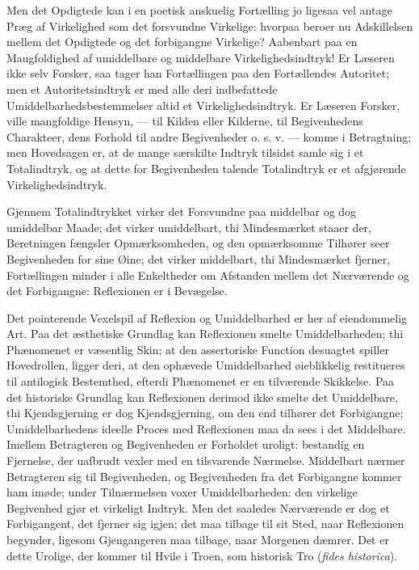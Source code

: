 \documentclass[12pt]{book}
\newcommand{\opage}[1]{\marginnote{\footnotesize\textit{[#1]}}}
\begin{document}
Men det Opdigtede kan i en poetisk anskuelig Fortælling
jo ligesaa vel antage Præg af Virkelighed som det forsvundne
Virkelige: hvorpaa beroer nu Adskillelsen mellem det Opdigtede
og det forbigangne Virkelige? Aabenbart paa en Maugfoldighed %
af umiddelbare og middelbare Virkelighedsindtryk! Er
Læseren ikke selv Forsker, saa tager han Fortællingen paa den
Fortællendes Autoritet; men et Autoritetsindtryk er med alle
deri indbefattede Umiddelbarhedsbestemmelser altid et Virkelighedsindtryk.
Er Læseren Forsker, ville mangfoldige Hensyn,
--- til Kilden eller Kilderne, til Begivenhedens Charakteer,
dens Forhold til andre Begivenheder o. s. v. --- komme i
Betragtning; men Hovedsagen er, at de mange særskilte Indtryk
tilsidst samle sig i et Totalindtryk, og at dette for Begivenheden
talende Totalindtryk er et afgjørende Virkelighedsindtryk.

Gjennem Totalindtrykket virker det Forsvundne paa
middelbar og dog umiddelbar Maade; det virker umiddelbart,
thi Mindesmærket staaer der, Beretningen fængsler Opmærksomheden,
og den opmærksomme Tilhører seer Begivenheden
for sine Øine; det virker middelbart, thi Mindesmærket
fjerner, Fortællingen minder i alle Enkeltheder om Afstanden
\opage{207}mellem det Nærværende og det Forbigangne: Reflexionen er
i Bevægelse.

Det pointerende Vexelspil af Reflexion og Umiddelbarhed
er her af eiendommelig Art. Paa det æsthetiske Grundlag kan
Reflexionen smelte Umiddelbarheden; thi Phænomenet er væsentlig
Skin; at den assertoriske Function desuagtet spiller
Hovedrollen, ligger deri, at den ophævede Umiddelbarhed øieblikkelig
restitueres til antilogisk Bestemthed, efterdi Phænomenet
er en tilværende Skikkelse. Paa det historiske Grundlag
kan Reflexionen derimod ikke smelte det Umiddelbare, thi
Kjendsgjerning er dog Kjendsgjerning, om den end tilhører det
Forbigangne; Umiddelbarhedens ideelle Proces med Reflexionen
maa da sees i det Middelbare. Imellem Betragteren og Begivenheden
er Forholdet uroligt: bestandig en Fjernelse, der
uafbrudt vexler med en tilsvarende Nærmelse. Middelbart
nærmer Betragteren sig til Begivenheden, og Begivenheden fra
det Forbigangne kommer ham imøde; under Tilnærmelsen
voxer Umiddelbarheden: den virkelige Begivenhed gjør et virkeligt
Indtryk. Men det saaledes Nærværende er dog et
Forbigangent, det fjerner sig igjen; det maa tilbage til sit
Sted, naar Reflexionen begynder, ligesom Gjengangeren maa
tilbage, naar Morgenen dæmrer. Det er dette Urolige, der
kommer til Hvile i Troen, som historisk Tro (\textit{fides historica}).
\end{document}
